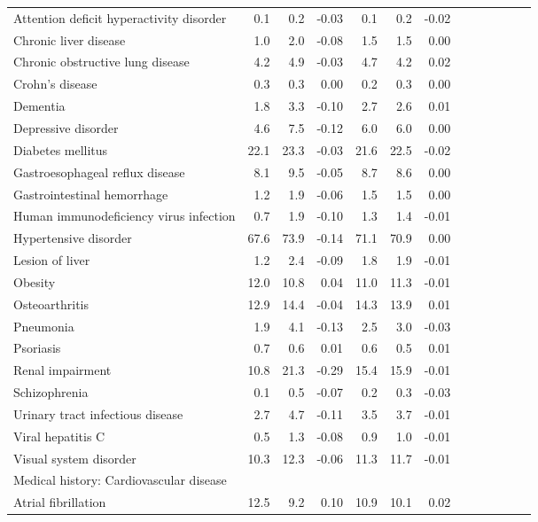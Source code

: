 \documentclass[11pt,]{article}
\begin{document}
\begin{longtable}{lrrrrrrrrrrrr}
      Attention deficit hyperactivity disorder &  0.1 &  0.2 & -0.03 &  0.1 &  0.2 & -0.02 \\ 
      Chronic liver disease &  1.0 &  2.0 & -0.08 &  1.5 &  1.5 &  0.00 \\ 
      Chronic obstructive lung disease &  4.2 &  4.9 & -0.03 &  4.7 &  4.2 &  0.02 \\ 
      Crohn's disease &  0.3 &  0.3 &  0.00 &  0.2 &  0.3 &  0.00 \\ 
      Dementia &  1.8 &  3.3 & -0.10 &  2.7 &  2.6 &  0.01 \\ 
      Depressive disorder &  4.6 &  7.5 & -0.12 &  6.0 &  6.0 &  0.00 \\ 
      Diabetes mellitus & 22.1 & 23.3 & -0.03 & 21.6 & 22.5 & -0.02 \\ 
      Gastroesophageal reflux disease &  8.1 &  9.5 & -0.05 &  8.7 &  8.6 &  0.00 \\ 
      Gastrointestinal hemorrhage &  1.2 &  1.9 & -0.06 &  1.5 &  1.5 &  0.00 \\ 
      Human immunodeficiency virus infection &  0.7 &  1.9 & -0.10 &  1.3 &  1.4 & -0.01 \\ 
      Hypertensive disorder & 67.6 & 73.9 & -0.14 & 71.1 & 70.9 &  0.00 \\ 
      Lesion of liver &  1.2 &  2.4 & -0.09 &  1.8 &  1.9 & -0.01 \\ 
      Obesity & 12.0 & 10.8 &  0.04 & 11.0 & 11.3 & -0.01 \\ 
      Osteoarthritis & 12.9 & 14.4 & -0.04 & 14.3 & 13.9 &  0.01 \\ 
      Pneumonia &  1.9 &  4.1 & -0.13 &  2.5 &  3.0 & -0.03 \\ 
      Psoriasis &  0.7 &  0.6 &  0.01 &  0.6 &  0.5 &  0.01 \\ 
      Renal impairment & 10.8 & 21.3 & -0.29 & 15.4 & 15.9 & -0.01 \\ 
      Schizophrenia &  0.1 &  0.5 & -0.07 &  0.2 &  0.3 & -0.03 \\ 
      Urinary tract infectious disease &  2.7 &  4.7 & -0.11 &  3.5 &  3.7 & -0.01 \\ 
      Viral hepatitis C &  0.5 &  1.3 & -0.08 &  0.9 &  1.0 & -0.01 \\ 
      Visual system disorder & 10.3 & 12.3 & -0.06 & 11.3 & 11.7 & -0.01 \\ 
  Medical history: Cardiovascular disease &    &    &     &    &    &     \\ 
      Atrial fibrillation & 12.5 &  9.2 &  0.10 & 10.9 & 10.1 &  0.02 \\ 

\end{longtable}
\end{document}
